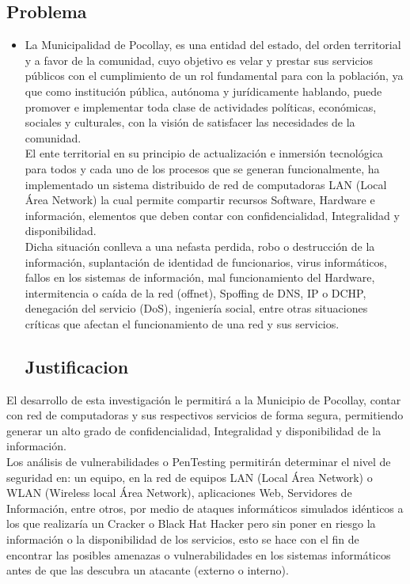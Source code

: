 \documentclass[twoside,twocolumn]{article}
\begin{document}
\subsection{Problema}
\begin{itemize}
\item La Municipalidad de Pocollay, es una
entidad del estado, del orden territorial y a favor de la comunidad, cuyo objetivo es velar y
prestar sus servicios públicos con el cumplimiento de un rol fundamental para con la
población, ya que como institución pública, autónoma y jurídicamente hablando, puede
promover e implementar toda clase de actividades políticas, económicas, sociales y
culturales, con la visión de satisfacer las necesidades de la comunidad.\\
El ente territorial en su principio de actualización e inmersión tecnológica para todos y cada
uno de los procesos que se generan funcionalmente, ha implementado un sistema
distribuido de red de computadoras LAN (Local Área Network) la cual permite compartir
recursos Software, Hardware e información, elementos que deben contar con
confidencialidad, Integralidad y disponibilidad.\\
Dicha situación conlleva a una nefasta perdida, robo o destrucción de la información,
suplantación de identidad de funcionarios, virus informáticos, fallos en los sistemas de
información, mal funcionamiento del Hardware, intermitencia o caída de la red (offnet),
Spoffing de DNS, IP o DCHP, denegación del servicio (DoS), ingeniería social, entre otras
situaciones críticas que afectan el funcionamiento de una red y sus servicios.

\subsection{Justificacion}
\end{itemize}
El desarrollo de esta investigación le permitirá a la Municipio de Pocollay, contar con red de computadoras y sus respectivos servicios de forma segura,
permitiendo generar un alto grado de confidencialidad, Integralidad y disponibilidad de la
información.\\
Los análisis de vulnerabilidades o PenTesting permitirán determinar el nivel de seguridad
en: un equipo, en la red de equipos LAN (Local Área Network) o WLAN (Wireless local
Área Network), aplicaciones Web, Servidores de Información, entre otros, por medio de
ataques informáticos simulados idénticos a los que realizaría un Cracker o Black Hat
Hacker pero sin poner en riesgo la información o la disponibilidad de los servicios, esto se
hace con el fin de encontrar las posibles amenazas o vulnerabilidades en los sistemas
informáticos antes de que las descubra un atacante (externo o interno).
\end{document}
